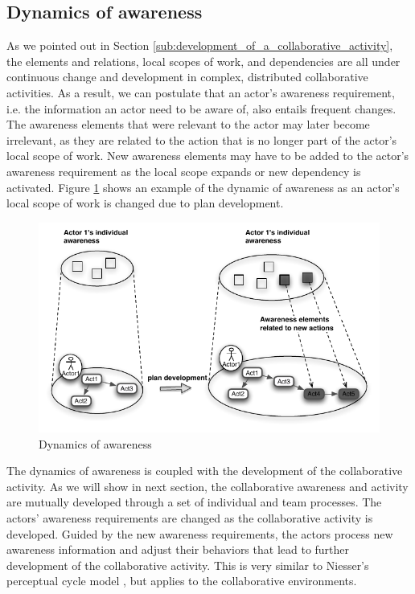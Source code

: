 \subsection{Dynamics of awareness} %
\label{sub:dynamics_of_awareness}
As we pointed out in Section \ref{sub:development_of_a_collaborative_activity}, the elements and relations, local scopes of work, and dependencies are all under continuous change and development in complex, distributed collaborative activities. As a result, we can postulate that an actor's awareness requirement, i.e. the information an actor need to be aware of, also entails frequent changes. The awareness elements that were relevant to the actor may later become irrelevant, as they are related to the action that is no longer part of the actor's local scope of work. New awareness elements may have to be added to the actor's awareness requirement as the local scope expands or new dependency is activated. Figure \ref{fig:dynamics_of_awareness} shows an example of the dynamic of awareness as an actor's local scope of work is changed due to plan development.

\begin{figure}[htbp] %
   \centering
   \includegraphics{dynamics_of_awareness.pdf} 
   \caption{Dynamics of awareness}
   \label{fig:dynamics_of_awareness}
\end{figure}

The dynamics of awareness is coupled with the development of the collaborative activity. As we will show in next section, the collaborative awareness and activity are mutually developed through a set of individual and team processes. The actors' awareness requirements are changed as the collaborative activity is developed. Guided by the new awareness requirements, the actors process new awareness information and adjust their behaviors that lead to further development of the collaborative activity. This is very similar to Niesser's perceptual cycle model \cite{neisser1976cognition}, but applies to the collaborative environments.

